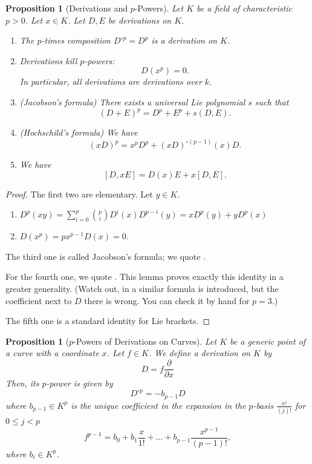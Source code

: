 \documentclass{amsart}
\newtheorem{prop}[thm]{Proposition}
\theoremstyle{definition}
\begin{document}
\begin{prop}[Derivations and $p$-Powers]\label{prop: identities for p-lie} Let $K$ be a field of characteristic $p>0$. Let $x\in K$. Let $D,E$ be derivations on $K$.

    \begin{enumerate}
        \item The $p$-times composition 
        $D^{\circ p}=D^p$
        is a derivation on $K$.
        \item Derivations kill $p$-powers: 
        $$D(x^p)=0.$$
        In particular, all derivations are derivations over $k$.
        \item (Jacobson's formula) There exists a universal Lie polynomial $s$ such that 
        $$\left(D+E\right)^p=D^p+E^p+s(D,E).$$
        \item (Hochschild's formula) We have 
        $$\left(xD\right)^p=x^pD^p+\left(xD\right)^{\circ (p-1)}(x)D.$$
        \item We have
        \[
        [D,xE]=D(x)E+x[D,E].
        \]
    \end{enumerate}
\end{prop}

\begin{proof}
    The first two are elementary. Let $y\in K$.
    \begin{enumerate}
        \item $D^p(xy)=\sum_{i=0}^p \binom{p}{i}D^i(x)D^{p-i}(y)=xD^p(y)+yD^p(x)$
        \item $D(x^p)=px^{p-1}D(x)=0$.
    \end{enumerate}
    
    The third one is called Jacobson's formula; we quote \cite[(5.2.4.)]{Katz_nilpotent_connections_1970}.

    For the fourth one, we quote \cite[Lemma 1]{Hochschild_1955}. This lemma proves exactly this identity in a greater generality. (Watch out, in \cite{Katz_nilpotent_connections_1970} a similar formula is introduced, but the coefficient next to $D$ there is wrong. You can check it by hand for $p=3$.)

    The fifth one is a standard identity for Lie brackets.
\end{proof}

\begin{prop}[$p$-Powers of Derivations on Curves]\label{prop: computing p-powers on curves}
    Let $K$ be a generic point of a curve with a coordinate $x$. 
    Let $f\in K$. We define a derivation on $K$ by
    \[
    D=f\frac{\partial}{\partial x}
    \]
    Then, its $p$-power is given by 
    \[
    D^{\circ p}=-b_{p-1} D
    \]
    where $b_{p-1}\in K^p$ is the unique coefficient in the expansion in the $p$-basis $\frac{x^{j}}{(j)!}$ for $0\le j<p$
    \[
    f^{p-1}=b_0+b_1\frac{x}{1!}+\ldots +b_{p-1}\frac{x^{p-1}}{(p-1)!},
    \]
    where $b_i\in K^p$.
\end{prop}
\end{document}
